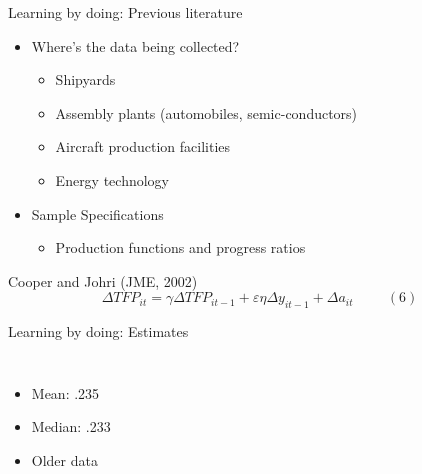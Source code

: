 \documentclass{beamer}
\begin{document}
\begin{frame}{Learning by doing: Previous literature}
    \begin{itemize}
        \item Where's the data being collected?
        \begin{itemize}
            \item Shipyards
            \item Assembly plants (automobiles, semic-conductors)
            \item Aircraft production facilities
            \item Energy technology
        \end{itemize}
        \item Sample Specifications
        \begin{itemize}
            \item Production functions and progress ratios
        \end{itemize}
    \end{itemize}
    \vspace{0.5cm}
    Cooper and Johri (JME, 2002)
    \[ \Delta TFP_{it} = \gamma \Delta TFP_{it-1} + \varepsilon \eta \Delta y_{it-1} + \Delta a_{it} \hspace{1cm} (6)\]
\end{frame}

\begin{frame}{Learning by doing: Estimates}
    \begin{columns}[c]
            \begin{itemize}
                \item Mean: .235
                \item Median: .233
                \item Older data
            \end{itemize}
    \end{columns}
\end{frame}
\end{document}
